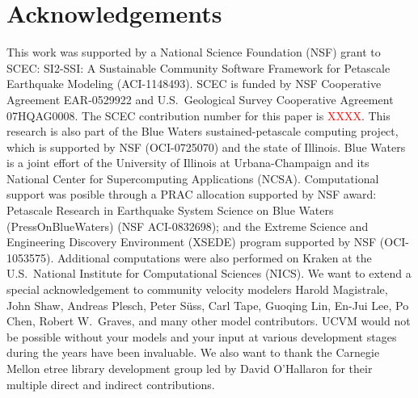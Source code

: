 
\section{Acknowledgements}

This work was supported by a National Science Foundation (NSF) grant to SCEC: SI2-SSI: A Sustainable Community Software Framework for Petascale Earthquake Modeling (ACI-1148493). SCEC is funded by NSF Cooperative Agreement EAR-0529922 and U.S.~Geological Survey Cooperative Agreement 07HQAG0008. The SCEC contribution number for this paper is \textcolor{red}{XXXX}. This research is also part of the Blue Waters sustained-petascale computing project, which is supported by NSF (OCI-0725070) and the state of Illinois. Blue Waters is a joint effort of the University of Illinois at Urbana-Champaign and its National Center for Supercomputing Applications (NCSA). Computational support was posible through a PRAC allocation supported by NSF award: Petascale Research in Earthquake System Science on Blue Waters (PressOnBlueWaters) (NSF ACI-0832698); and the Extreme Science and Engineering Discovery Environment (XSEDE) program supported by NSF (OCI-1053575). Additional computations were also performed on Kraken at the U.S.~National Institute for Computational Sciences (NICS). We want to extend a special acknowledgement to community velocity modelers Harold Magistrale, John Shaw, Andreas Plesch, Peter S\"{u}ss, Carl Tape, Guoqing Lin, En-Jui Lee, Po Chen, Robert W.~Graves, and many other model contributors. UCVM would not be possible without your models and your input at various development stages during the years have been invaluable. We also want to thank the Carnegie Mellon etree library development group led by David O'Hallaron for their multiple direct and indirect contributions.
